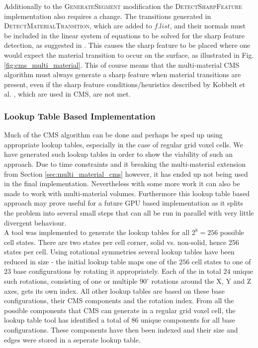 Additionally to the \textsc{GenerateSegment} modification the \textsc{DetectSharpFeature} implementation also requires a change. The transitions generated in \textsc{DetectMaterialTransition}, which are added to
$f.list$, and their normals must be included in the linear system of equations to be solved \cite{cubical_marching_squares} for the sharp feature detection,
as suggested in \cite{dual_contouring}. This causes the sharp feature to be placed where one would expect the material transition to occur on the surface, as illustrated in Fig. \ref{fig:cms_multi_material}.
This of course means that the multi-material CMS algorithm must always generate a sharp feature when material transitions are present, even if the sharp feature conditions/heuristics described by Kobbelt et al. \cite{kobbelt_sharp_features} , which are used in CMS, are not met.

\subsubsection{Lookup Table Based Implementation}

Much of the CMS algorithm can be done and perhaps be sped up using appropriate lookup tables, especially in the case of regular grid voxel cells. We have generated such lookup tables in order to show
the viability of such an approach. Due to time constraints and it breaking the multi-material extension from Section \ref{sec:multi_material_cms} however, it has ended up not being used in the final implementation.
Nevertheless with some more work it can also be made to work with multi-material volumes. Furthermore this lookup table based approach may prove useful for a future GPU based implementation as it splits
the problem into several small steps that can all be run in parallel with very little divergent behaviour.\\
A tool was implemented to generate the lookup tables for all $2^8 = 256$ possible cell states. There are two states per cell corner, solid vs. non-solid, hence 256 states per cell. Using rotational symmetries several lookup tables have been reduced in size - the initial lookup table maps one of the $256$ cell states to one of $23$ base configurations by rotating it appropriately. Each of the in total $24$ unique such rotations, consisting of one or multiple $90^{\circ}$ rotations around the X, Y and Z axes, gets its own index.
All other lookup tables are based on these base configurations, their CMS components and the rotation index.
From all the possible components that CMS can generate in a regular grid voxel cell, the lookup table tool has identified a total of $86$ unique components for all base configurations. These components have
then been indexed and their size and edges were stored in a seperate lookup table.\\


